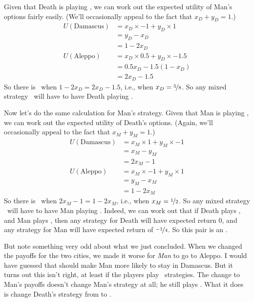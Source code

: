 Given that Death is playing , we can work out the expected utility of Man's options fairly easily. (We'll occasionally appeal to the fact that $x_D + y_D = 1$.)
\begin{align*}
U(\text{Damascus}) &= x_D \times -1 + y_D \times 1 \\
&= y_D - x_D \\
&= 1 - 2x_D \\
U(\text{Aleppo}) &= x_D \times 0.5 + y_D \times -1.5 \\
&= 0.5x_D - 1.5(1 - x_D) \\
&= 2x_D - 1.5 
\end{align*}
\noindent So there is \eqm\ when $1 - 2x_D = 2x_D - 1.5$, i.e., when $x_D = \nicefrac{5}{8}$. So any mixed strategy \eqm\ will have to have Death playing .

Now let's do the same calculation for Man's strategy. Given that Man is playing , we can work out the expected utility of Death's options. (Again, we'll occasionally appeal to the fact that $x_M + y_M = 1$.)
\begin{align*}
U(\text{Damascus}) &= x_M \times 1 + y_M \times -1 \\
&= x_M - y_M \\
&= 2x_M - 1 \\
U(\text{Aleppo}) &= x_M \times -1 + y_M \times 1 \\
&= y_M - x_M \\
&= 1 - 2x_M 
\end{align*}
\noindent So there is \eqm\ when $2x_M - 1 = 1 - 2x_M$, i.e., when $x_M = \nicefrac{1}{2}$. So any mixed strategy \eqm\ will have to have Man playing . Indeed, we can work out that if Death plays , and Man plays , then any strategy for Death will have expected return 0, and any strategy for Man will have expected return of $\nicefrac{-1}{4}$. So this pair is an \eqm.

But note something very odd about what we just concluded. When we chang\-ed the payoffs for the two cities, we made it worse for \textit{Man} to go to Aleppo. I would have guessed that should make Man more likely to stay in Damascus. But it turns out this isn't right, at least if the players play \eqm\ strategies. The change to Man's payoffs doesn't change Man's strategy at all; he still plays . What it does is change Death's strategy from  to .


